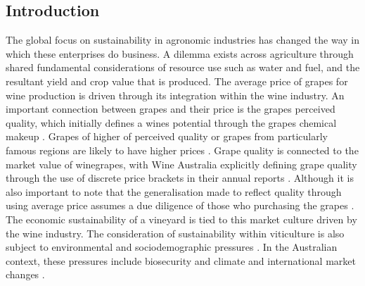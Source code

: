 \documentclass[review,12pt,authoryear]{elsarticle}
\begin{document}
\begin{linenumbers}

\section{Introduction}
The global focus on sustainability in agronomic industries has changed the way in which these enterprises do business. A dilemma exists across agriculture through shared fundamental considerations of resource use such as water and fuel, and the resultant yield and crop value that is produced\citep{hemmingCherryTomatoProduction2020,kawasakiQualityMattersMore2016, zhuEffectsNitrogenLevel2017}. The average price of grapes for wine production is driven through its integration within the wine industry. An important connection between grapes and their price is the grapes perceived quality, which initially defines a wines potential through the grapes chemical makeup \citep{blackTerpenoidsTheirRole2015,schreierFlavorCompositionWines1979}. Grapes of higher of perceived quality or grapes from particularly famous regions are likely to have higher prices \citep{wineaustraliaNationalVintageReport2021}.  Grape quality is connected to the market value of winegrapes, with Wine Australia explicitly defining grape quality through the use of discrete price brackets in their annual reports \citep{winemakersfederationofaustraliaNationalVintageReport2018}. Although it is also important to note that the generalisation made to reflect quality through using average price assumes a due diligence of those who purchasing the grapes \citep{yeggeInfluenceSensoryNonsensory2001}. The economic sustainability of a vineyard is tied to this market culture driven by the wine industry. The consideration of sustainability within viticulture is also subject to environmental and sociodemographic pressures \citep{santiago-brownSustainabilityAssessmentWineGrape2015}. In the Australian context, these pressures include biosecurity and climate and international market changes \citep{canadellMultidecadalIncreaseForest2021,longbottomRoleVineyardPractices2015,oliverReviewSoilPhysical2013}.
\par

\end{linenumbers}
\end{document}
